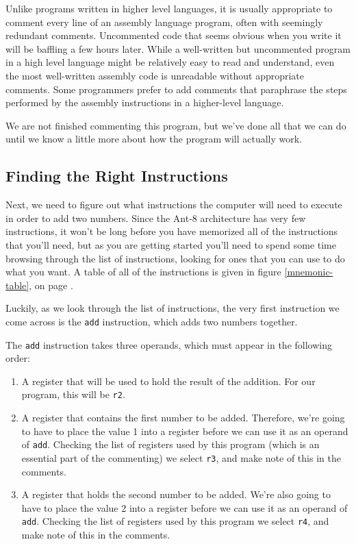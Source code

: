 Unlike programs written in higher level languages, it is usually
appropriate to comment every line of an assembly language program,
often with seemingly redundant comments.  Uncommented code that seems
obvious when you write it will be baffling a few hours later.  While a
well-written but uncommented program in a high level language might be
relatively easy to read and understand, even the most well-written
assembly code is unreadable without appropriate comments.  Some
programmers prefer to add comments that paraphrase the steps performed
by the assembly instructions in a higher-level language.

We are not finished commenting this program,
but we've done all that we can do until we know a little more about
how the program will actually work.

\subsection{Finding the Right Instructions}

Next, we need to figure out what instructions the computer will need
to execute in order to add two numbers.  Since the {\sc Ant-8} architecture
has very few instructions, it won't be long before you have memorized
all of the instructions that you'll need, but as you are getting
started you'll need to spend some time browsing through the list of
instructions, looking for ones that you can use to do what you want. 
A table of all of the instructions is given in figure
\ref{mnemonic-table}, on page \pageref{mnemonic-table}.

Luckily, as we look through the list of instructions, the very first
instruction we come across is the {\tt add} instruction, which adds
two numbers together.

The {\tt add} instruction takes three operands, which must appear
in the following order:

\begin{enumerate}

\item A register that will be used to hold the result of the addition. 
	For our program, this will be {\tt r2}.

\item A register that contains the first number to be added. 
	Therefore, we're going to have to place the value 1 into a
	register before we can use it as an operand of {\tt add}. 
	Checking the list of registers used by this program (which is
	an essential part of the commenting) we select {\tt r3}, and
	make note of this in the comments.

\item A register that holds the second number to be added.  We're also
	going to have to place the value 2 into a register before we
	can use it as an operand of {\tt add}.  Checking the list of
	registers used by this program we select {\tt r4}, and make
	note of this in the comments.

\end{enumerate}

